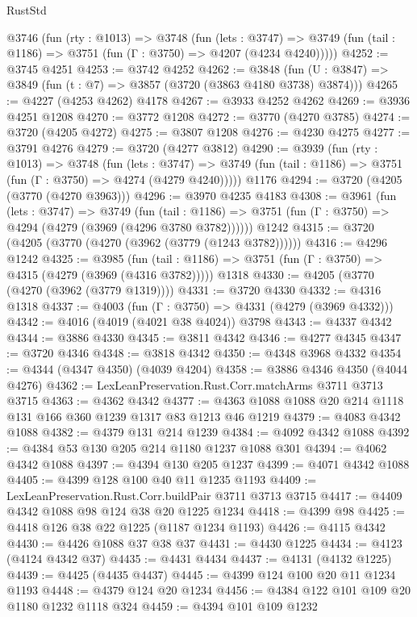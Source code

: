 \begin{lexlean}{RustStd}
\begin{coremodule}
  @3746
    (fun (rty : @1013) =>
    @3748
      (fun (lets : @3747) =>
      @3749 (fun (tail : @1186) => @3751 (fun (Γ : @3750) => @4207 (@4234 @4240)))))
@4252 := @3745 @4251
@4253 := @3742 @4252
@4262 := @3848 (fun (U : @3847) => @3849 (fun (t : @7) => @3857 (@3720 (@3863 @4180 @3738) @3874)))
@4265 := @4227 (@4253 @4262) @4178
@4267 := @3933 @4252 @4262
@4269 := @3936 @4251 @1208
@4270 := @3772 @1208
@4272 := @3770 (@4270 @3785)
@4274 := @3720 (@4205 @4272)
@4275 := @3807 @1208
@4276 := @4230 @4275
@4277 := @3791 @4276
@4279 := @3720 (@4277 @3812)
@4290 := @3939
    (fun (rty : @1013) =>
    @3748
      (fun (lets : @3747) =>
      @3749 (fun (tail : @1186) => @3751 (fun (Γ : @3750) => @4274 (@4279 @4240)))))
    @1176
@4294 := @3720 (@4205 (@3770 (@4270 @3963)))
@4296 := @3970 @4235 @4183
@4308 := @3961
    (fun (lets : @3747) =>
    @3749
      (fun (tail : @1186) => @3751 (fun (Γ : @3750) => @4294 (@4279 (@3969 (@4296 @3780 @3782))))))
    @1242
@4315 := @3720 (@4205 (@3770 (@4270 (@3962 (@3779 (@1243 @3782))))))
@4316 := @4296 @1242
@4325 := @3985
    (fun (tail : @1186) => @3751 (fun (Γ : @3750) => @4315 (@4279 (@3969 (@4316 @3782)))))
    @1318
@4330 := @4205 (@3770 (@4270 (@3962 (@3779 @1319))))
@4331 := @3720 @4330
@4332 := @4316 @1318
@4337 := @4003 (fun (Γ : @3750) => @4331 (@4279 (@3969 @4332)))
@4342 := @4016 (@4019 (@4021 @38 @4024)) @3798
@4343 := @4337 @4342
@4344 := @3886 @4330
@4345 := @3811 @4342
@4346 := @4277 @4345
@4347 := @3720 @4346
@4348 := @3818 @4342
@4350 := @4348 @3968 @4332
@4354 := @4344 (@4347 @4350) (@4039 @4204)
@4358 := @3886 @4346 @4350 (@4044 @4276)
@4362 := LexLeanPreservation.Rust.Corr.matchArms @3711 @3713 @3715
@4363 := @4362 @4342
@4377 := @4363 @1088 @1088 @20 @214 @1118 @131 @166 @360 @1239 @1317 @83 @1213 @46 @1219
@4379 := @4083 @4342 @1088
@4382 := @4379 @131 @214 @1239
@4384 := @4092 @4342 @1088
@4392 := @4384 @53 @130 @205 @214 @1180 @1237 @1088 @301
@4394 := @4062 @4342 @1088
@4397 := @4394 @130 @205 @1237
@4399 := @4071 @4342 @1088
@4405 := @4399 @128 @100 @40 @11 @1235 @1193
@4409 := LexLeanPreservation.Rust.Corr.buildPair @3711 @3713 @3715
@4417 := @4409 @4342 @1088 @98 @124 @38 @20 @1225 @1234
@4418 := @4399 @98
@4425 := @4418 @126 @38 @22 @1225 (@1187 @1234 @1193)
@4426 := @4115 @4342
@4430 := @4426 @1088 @37 @38 @37
@4431 := @4430 @1225
@4434 := @4123 (@4124 @4342 @37)
@4435 := @4431 @4434
@4437 := @4131 (@4132 @1225)
@4439 := @4425 (@4435 @4437)
@4445 := @4399 @124 @100 @20 @11 @1234 @1193
@4448 := @4379 @124 @20 @1234
@4456 := @4384 @122 @101 @109 @20 @1180 @1232 @1118 @324
@4459 := @4394 @101 @109 @1232

\end{coremodule}
\end{lexlean}
